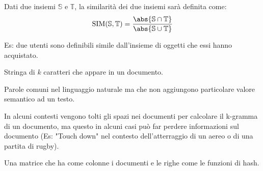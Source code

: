 \documentclass[\main/main.tex]{subfiles}
\begin{document}
\begin{definition}
Dati due insiemi $\mathbb{S}$ e $\mathbb{T}$, la similarità dei due insiemi sarà definita come:
\[
	\text{SIM}(\mathbb{S}, \mathbb{T}) = \dfrac{\abs{\mathbb{S} \cap \mathbb{T}}}{\abs{\mathbb{S} \cup \mathbb{T}}}
\]
\end{definition}

Es: due utenti sono definibili simile dall'insieme di oggetti che essi hanno acquistato.

\begin{definition}[K-gramma]
Stringa di $k$ caratteri che appare in un documento.
\end{definition}

\begin{definition}
Parole comuni nel linguaggio naturale ma che non aggiungono particolare valore semantico ad un testo.
\end{definition}

In alcuni contesti vengono tolti gli spazi nei documenti per calcolare il k-gramma di un documento, ma questo in alcuni casi può far perdere informazioni sul documento (Es: "Touch down" nel contesto dell'atterraggio di un aereo o di una partita di rugby).

\begin{definition}
Una matrice che ha come colonne i documenti e le righe come le funzioni di hash.
\end{definition}
\end{document}
